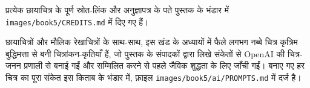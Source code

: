 प्रत्येक छायाचित्र के पूर्ण स्रोत-लिंक और अनुज्ञापत्र के पते पुस्तक के
भंडार में \texttt{images/\allowbreak book5/\allowbreak CREDITS.md} में दिए गए हैं।

\bigskip
छायाचित्रों और मौलिक रेखाचित्रों के साथ-साथ, इस खंड के अध्यायों में फैले
लगभग नब्बे चित्र कृत्रिम बुद्धिमत्ता से बनी चित्रांकन-कृतियाँ हैं, जो
पुस्तक के संपादकों द्वारा लिखे संकेतों से OpenAI की चित्र-जनन प्रणाली से
बनाई गईं और सम्मिलित करने से पहले जैविक शुद्धता के लिए जाँची गईं।
बनाए गए हर चित्र का पूरा संकेत इस किताब के भंडार में, फ़ाइल
\texttt{images/\allowbreak book5/\allowbreak ai/\allowbreak PROMPTS.md} में दर्ज है।
\par\endgroup
\clearpage
